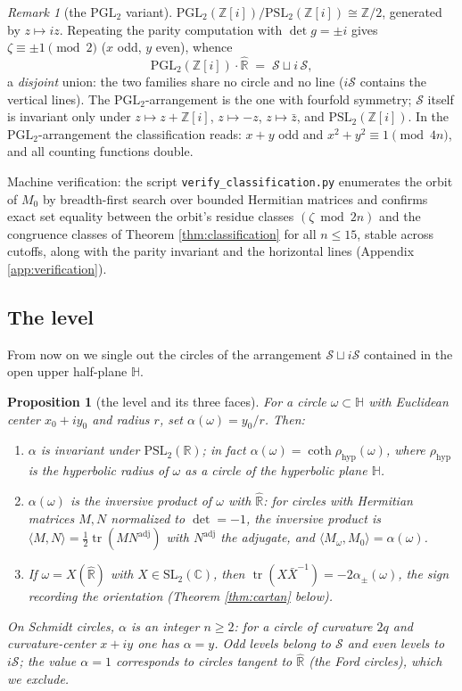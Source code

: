 \documentclass[11pt]{amsart}
\numberwithin{equation}{section}
\theoremstyle{plain}
\newtheorem{proposition}[theorem]{Proposition}
\theoremstyle{definition}
\theoremstyle{remark}
\newtheorem{remark}[theorem]{Remark}
\newcommand{\C}{\mathbb{C}}
\newcommand{\R}{\mathbb{R}}
\newcommand{\Z}{\mathbb{Z}}
\newcommand{\HH}{\mathbb{H}}
\newcommand{\Zi}{\Z[i]}
\newcommand{\Rhat}{\widehat{\R}}
\newcommand{\SL}{\mathrm{SL}}
\newcommand{\PSL}{\mathrm{PSL}}
\newcommand{\PGL}{\mathrm{PGL}}
\newcommand{\tr}{\operatorname{tr}}
\newcommand{\Sarr}{\mathcal{S}}
\begin{document}
\begin{remark}[the $\PGL_2$ variant]\label{rem:pgl}
$\PGL_2(\Zi)/\PSL_2(\Zi) \cong \Z/2$, generated by $z \mapsto iz$.
Repeating the parity computation with $\det g = \pm i$ gives
$\zeta \equiv \pm 1 \pmod 2$ ($x$ odd, $y$ even), whence
\[
  \PGL_2(\Zi)\cdot\Rhat \;=\; \Sarr \sqcup i\,\Sarr,
\]
a \emph{disjoint} union: the two families share no circle and no line
($i\Sarr$ contains the vertical lines).  The $\PGL_2$-arrangement is the
one with fourfold symmetry; $\Sarr$ itself is invariant only under
$z \mapsto z + \Zi$, $z \mapsto -z$, $z \mapsto \bar z$, and
$\PSL_2(\Zi)$.  In the $\PGL_2$-arrangement the classification reads:
$x + y$ odd and $x^2 + y^2 \equiv 1 \pmod{4n}$, and all counting
functions double.
\end{remark}

Machine verification: the script \texttt{verify\_classification.py}
enumerates the orbit of $M_0$ by breadth-first search over bounded
Hermitian matrices and confirms exact set equality between the orbit's
residue classes $(\zeta \bmod 2n)$ and the congruence classes of Theorem
\ref{thm:classification} for all $n \le 15$, stable across cutoffs, along
with the parity invariant and the horizontal lines (Appendix
\ref{app:verification}).

\subsection{The level}\label{subsec:level}

From now on we single out the circles of the arrangement
$\Sarr \sqcup i\Sarr$ contained in the open upper half-plane $\HH$.

\begin{proposition}[the level and its three faces]\label{prop:level}
For a circle $\omega \subset \HH$ with Euclidean center $x_0 + iy_0$ and
radius $r$, set $\alpha(\omega) = y_0/r$.  Then:
\begin{enumerate}
\item $\alpha$ is invariant under $\PSL_2(\R)$; in fact
$\alpha(\omega) = \coth \rho_{\mathrm{hyp}}(\omega)$, where
$\rho_{\mathrm{hyp}}$ is the hyperbolic radius of $\omega$ as a circle of
the hyperbolic plane $\HH$.
\item $\alpha(\omega)$ is the inversive product of $\omega$ with
$\Rhat$: for circles with Hermitian matrices $M, N$ normalized to
$\det = -1$, the inversive product is
$\langle M, N\rangle = \tfrac12 \tr(M N^{\mathrm{adj}})$ with
$N^{\mathrm{adj}}$ the adjugate, and
$\langle M_\omega, M_0\rangle = \alpha(\omega)$.
\item If $\omega = X(\Rhat)$ with $X \in \SL_2(\C)$, then
$\tr(X \bar X^{-1}) = -2\alpha_\pm(\omega)$, the sign recording the
orientation (Theorem \ref{thm:cartan} below).
\end{enumerate}
On Schmidt circles, $\alpha$ is an integer $n \ge 2$: for a circle of
curvature $2q$ and curvature-center $x + iy$ one has $\alpha = y$.  Odd
levels belong to $\Sarr$ and even levels to $i\Sarr$; the value
$\alpha = 1$ corresponds to circles tangent to $\Rhat$ (the Ford
circles), which we exclude.
\end{proposition}
\end{document}

